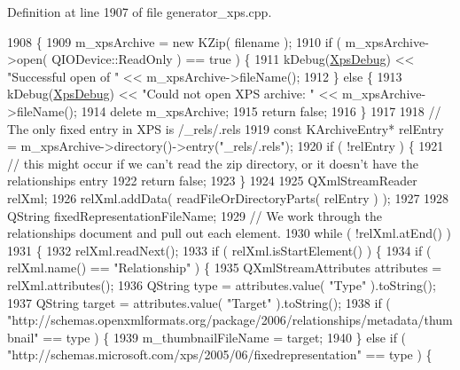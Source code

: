 Definition at line 1907 of file generator\+\_\+xps.\+cpp.


\begin{DoxyCode}
1908 \{
1909     m\_xpsArchive = \textcolor{keyword}{new} KZip( filename );
1910     \textcolor{keywordflow}{if} ( m\_xpsArchive->open( QIODevice::ReadOnly ) == true ) \{
1911         kDebug(\hyperlink{generator__xps_8cpp_a00c0825a8bf77ed142d9a5a205d66f3c}{XpsDebug}) << \textcolor{stringliteral}{"Successful open of "} << m\_xpsArchive->fileName();
1912     \} \textcolor{keywordflow}{else} \{
1913         kDebug(\hyperlink{generator__xps_8cpp_a00c0825a8bf77ed142d9a5a205d66f3c}{XpsDebug}) << \textcolor{stringliteral}{"Could not open XPS archive: "} << m\_xpsArchive->fileName();
1914         \textcolor{keyword}{delete} m\_xpsArchive;
1915         \textcolor{keywordflow}{return} \textcolor{keyword}{false};
1916     \}
1917 
1918     \textcolor{comment}{// The only fixed entry in XPS is /\_rels/.rels}
1919     \textcolor{keyword}{const} KArchiveEntry* relEntry = m\_xpsArchive->directory()->entry(\textcolor{stringliteral}{"\_rels/.rels"});
1920     \textcolor{keywordflow}{if} ( !relEntry ) \{
1921         \textcolor{comment}{// this might occur if we can't read the zip directory, or it doesn't have the relationships entry}
1922         \textcolor{keywordflow}{return} \textcolor{keyword}{false};
1923     \}
1924 
1925     QXmlStreamReader relXml;
1926     relXml.addData( readFileOrDirectoryParts( relEntry ) );
1927 
1928     QString fixedRepresentationFileName;
1929     \textcolor{comment}{// We work through the relationships document and pull out each element.}
1930     \textcolor{keywordflow}{while} ( !relXml.atEnd() )
1931     \{
1932         relXml.readNext();
1933         \textcolor{keywordflow}{if} ( relXml.isStartElement() ) \{
1934             \textcolor{keywordflow}{if} ( relXml.name() == \textcolor{stringliteral}{"Relationship"} ) \{
1935                 QXmlStreamAttributes attributes = relXml.attributes();
1936                 QString type = attributes.value( \textcolor{stringliteral}{"Type"} ).toString();
1937                 QString target = attributes.value( \textcolor{stringliteral}{"Target"} ).toString();
1938                 \textcolor{keywordflow}{if} ( \textcolor{stringliteral}{"http://schemas.openxmlformats.org/package/2006/relationships/metadata/thumbnail"} == 
      type ) \{
1939                     m\_thumbnailFileName = target;
1940                 \} \textcolor{keywordflow}{else} \textcolor{keywordflow}{if} ( \textcolor{stringliteral}{"http://schemas.microsoft.com/xps/2005/06/fixedrepresentation"} == type ) \{

\end{DoxyCode}
